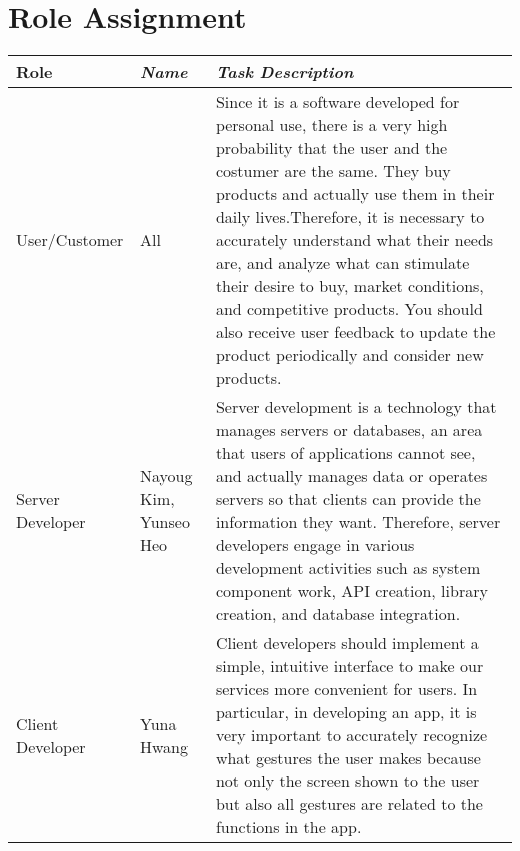 \documentclass[conference]{IEEEtran}
\begin{document}
\section*{Role Assignment}
\begin{table}[hbt!]
\begin{tabular}{|p{}|p{}|p{}|}
\cline{1-3} 
\textbf{Role} & \textbf{\textit{Name}}& \textbf{\textit{Task Description}}\\
\hline
User/Customer&All&Since it is a software developed for personal use, there is a very high probability that the user and the costumer are the same. They buy products and actually use them in their daily lives.Therefore, it is necessary to accurately understand what their needs are, and analyze what can stimulate their desire to buy, market conditions, and competitive products. You should also receive user feedback to update the product periodically and consider new products. \\
\hline
Server Developer&Nayoug Kim, Yunseo Heo&Server development is a technology that manages servers or databases, an area that users of applications cannot see, and actually manages data or operates servers so that clients can provide the information they want. Therefore, server developers engage in various development activities such as system component work, API creation, library creation, and database integration.\\
\hline
Client Developer&Yuna Hwang&Client developers should implement a simple, intuitive interface to make our services more convenient for users. In particular, in developing an app, it is very important to accurately recognize what gestures the user makes because not only the screen shown to the user but also all gestures are related to the functions in the app.\\
\hline
\end{tabular}
\end{table}
\end{document}
